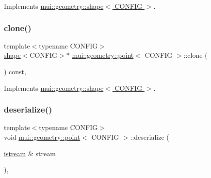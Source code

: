 Implements \hyperlink{classmui_1_1geometry_1_1shape_adf598ec651ea425553bd8e617cac7430}{mui\+::geometry\+::shape$<$ C\+O\+N\+F\+I\+G $>$}.

\mbox{\label{classmui_1_1geometry_1_1point_ab6e1db8a0e4c6bf07baa31d3e03b0e9c}} 
\subsubsection{\texorpdfstring{clone()}{clone()}}
{\footnotesize\ttfamily template$<$typename C\+O\+N\+F\+IG$>$ \\
\hyperlink{classmui_1_1geometry_1_1shape}{shape}$<$C\+O\+N\+F\+IG$>$$\ast$ \hyperlink{classmui_1_1geometry_1_1point}{mui\+::geometry\+::point}$<$ C\+O\+N\+F\+IG $>$\+::clone (\begin{DoxyParamCaption}{ }\end{DoxyParamCaption}) const\hspace{0.3cm}{\ttfamily [inline]}, {\ttfamily [virtual]}}



Implements \hyperlink{classmui_1_1geometry_1_1shape_a4d1307ebc40d462b13da89c811b3beb7}{mui\+::geometry\+::shape$<$ C\+O\+N\+F\+I\+G $>$}.

\mbox{\label{classmui_1_1geometry_1_1point_ad51109c7b96af086ac9a7cb5422a5d2e}} 
\subsubsection{\texorpdfstring{deserialize()}{deserialize()}}
{\footnotesize\ttfamily template$<$typename C\+O\+N\+F\+IG$>$ \\
void \hyperlink{classmui_1_1geometry_1_1point}{mui\+::geometry\+::point}$<$ C\+O\+N\+F\+IG $>$\+::deserialize (\begin{DoxyParamCaption}\item[{\hyperlink{classmui_1_1istream}{istream} \&}]{stream }\end{DoxyParamCaption})\hspace{0.3cm}{\ttfamily [inline]}, {\ttfamily [virtual]}}



